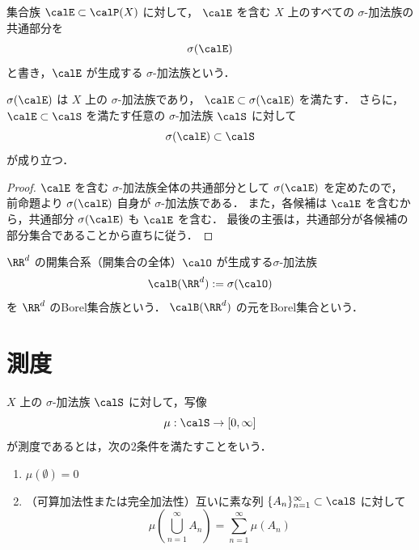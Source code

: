 \begin{definition}
集合族 $\calE \subset \calP(X)$ に対して，
$\calE$ を含む $X$ 上のすべての $\sigma$-加法族の共通部分を
\[
\sigma(\calE)
\]
と書き，$\calE$ が生成する $\sigma$-加法族という．
\end{definition}

\begin{proposition}
$\sigma(\calE)$ は $X$ 上の $\sigma$-加法族であり，
$\calE \subset \sigma(\calE)$ を満たす．
さらに，$\calE \subset \calS$ を満たす任意の $\sigma$-加法族 $\calS$ に対して
\[
\sigma(\calE) \subset \calS
\]
が成り立つ．
\end{proposition}
\begin{proof}
$\calE$ を含む $\sigma$-加法族全体の共通部分として $\sigma(\calE)$ を定めたので，
前命題より $\sigma(\calE)$ 自身が $\sigma$-加法族である．
また，各候補は $\calE$ を含むから，共通部分 $\sigma(\calE)$ も $\calE$ を含む．
最後の主張は，共通部分が各候補の部分集合であることから直ちに従う．
\end{proof}

\begin{definition}[Borel集合族]
$\RR^d$ の開集合系（開集合の全体）$\calO$ が生成する$\sigma$-加法族
\[
\calB(\RR^d):=\sigma(\calO)
\]
を $\RR^d$ のBorel集合族という．
$\calB(\RR^d)$ の元をBorel集合という．
\end{definition}

\section{測度}

\begin{definition}[測度]
$X$ 上の $\sigma$-加法族 $\calS$ に対して，写像
\[
\mu:\calS \to [0,\infty]
\]
が測度であるとは，次の2条件を満たすことをいう．
\begin{enumerate}
    \item $\mu(\emptyset)=0$
    \item （可算加法性または完全加法性）互いに素な列 $\{A_n\}_{n=1}^{\infty}\subset \calS$ に対して
    \[
    \mu\left(\bigcup_{n=1}^{\infty}A_n\right)
    =
    \sum_{n=1}^{\infty}\mu(A_n)
    \]
\end{enumerate}
\end{definition}

